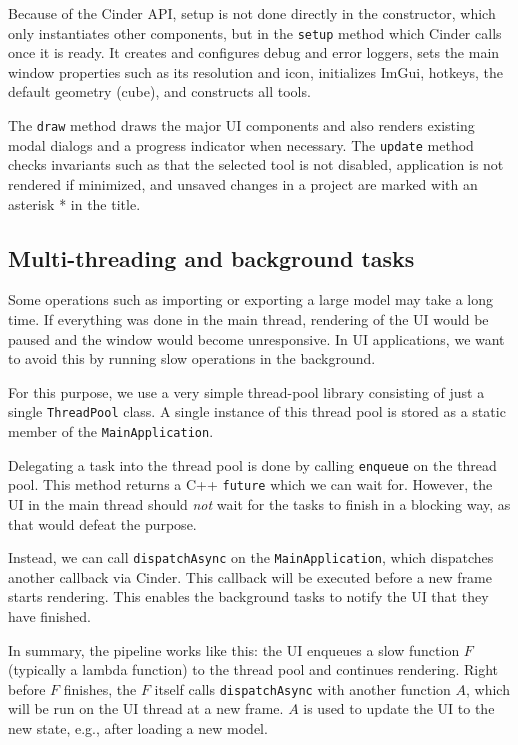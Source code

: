 Because of the Cinder API, setup is not done directly in the constructor, which only instantiates other components, but in the \texttt{setup} method which Cinder calls once it is ready.
It creates and configures debug and error loggers, sets the main window properties such as its resolution and icon, initializes ImGui, hotkeys, the default geometry (cube), and constructs all tools.

The \texttt{draw} method draws the major UI components and also renders existing modal dialogs and a progress indicator when necessary.
The \texttt{update} method checks invariants such as that the selected tool is not disabled, application is not rendered if minimized, and unsaved changes in a project are marked with an asterisk * in the title.

\subsection{Multi-threading and background tasks}

Some operations such as importing or exporting a large model may take a long time.
If everything was done in the main thread, rendering of the UI would be paused and the window would become unresponsive.
In UI applications, we want to avoid this by running slow operations in the background.

For this purpose, we use a very simple thread-pool library consisting of just a single \texttt{ThreadPool} class.
A single instance of this thread pool is stored as a static member of the \texttt{MainApplication}.

Delegating a task into the thread pool is done by calling \texttt{enqueue} on the thread pool.
This method returns a C++ \texttt{future} which we can wait for.
However, the UI in the main thread should \emph{not} wait for the tasks to finish in a blocking way, as that would defeat the purpose.

Instead, we can call \texttt{dispatchAsync} on the \texttt{MainApplication}, which dispatches another callback via Cinder.
This callback will be executed before a new frame starts rendering.
This enables the background tasks to notify the UI that they have finished.

In summary, the pipeline works like this: the UI enqueues a slow function $F$ (typically a lambda function) to the thread pool and continues rendering.
Right before $F$ finishes, the $F$ itself calls \texttt{dispatchAsync} with another function $A$, which will be run on the UI thread at a new frame.
$A$ is used to update the UI to the new state, e.g., after loading a new model.

